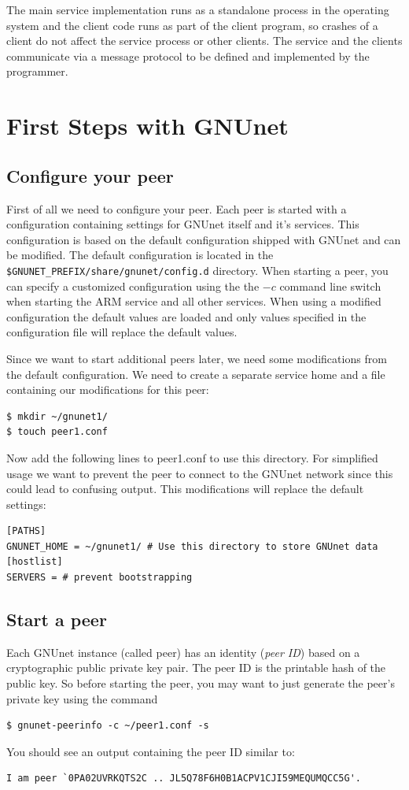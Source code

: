\documentclass[10pt]{article}
\begin{document}
The main service implementation runs as a standalone process in the operating
system and the client code runs as part of the client program, so crashes of a
client do not affect the service process or other clients. The service and the
clients communicate via a message protocol to be defined and implemented by
the programmer.

\section{First Steps with GNUnet}

\subsection{Configure your peer}
First of all we need to configure your peer. Each peer is started with a configuration containing settings for GNUnet itself and it's services. This configuration is based on the default configuration shipped with GNUnet and can be modified. The default configuration is located in the {\tt \$GNUNET\_PREFIX/share/gnunet/config.d} directory. When starting a peer, you can specify a customized configuration using the the {\tt$-c$} command line switch when starting the ARM service and all other services. When using a modified configuration the default values are loaded and only values specified in the configuration file will replace the default values.

Since we want to start additional peers later, we need
some modifications from the default configuration. We need to create a separate service home and a file containing our modifications for this peer:
\begin{lstlisting}
$ mkdir ~/gnunet1/
$ touch peer1.conf
\end{lstlisting}

Now add the following lines to peer1.conf to use this directory. For
simplified usage we want to prevent the peer to connect to the GNUnet
network since this could lead to confusing output. This modifications
will replace the default settings:
\begin{lstlisting}
[PATHS]
GNUNET_HOME = ~/gnunet1/ # Use this directory to store GNUnet data
[hostlist]
SERVERS = # prevent bootstrapping
\end{lstlisting}

\subsection{Start a peer}
Each GNUnet instance (called peer) has an identity (\textit{peer ID}) based on a
cryptographic public private key pair. The peer ID is the printable hash of the
public key. So before starting the peer, you may want to just generate the peer's private
key using the command
\lstset{language=bash}
\begin{lstlisting}
$ gnunet-peerinfo -c ~/peer1.conf -s
\end{lstlisting}
You should see an output containing the peer ID similar to:
\lstset{language=bash}
\begin{lstlisting}
I am peer `0PA02UVRKQTS2C .. JL5Q78F6H0B1ACPV1CJI59MEQUMQCC5G'.
\end{lstlisting}
\end{document}
